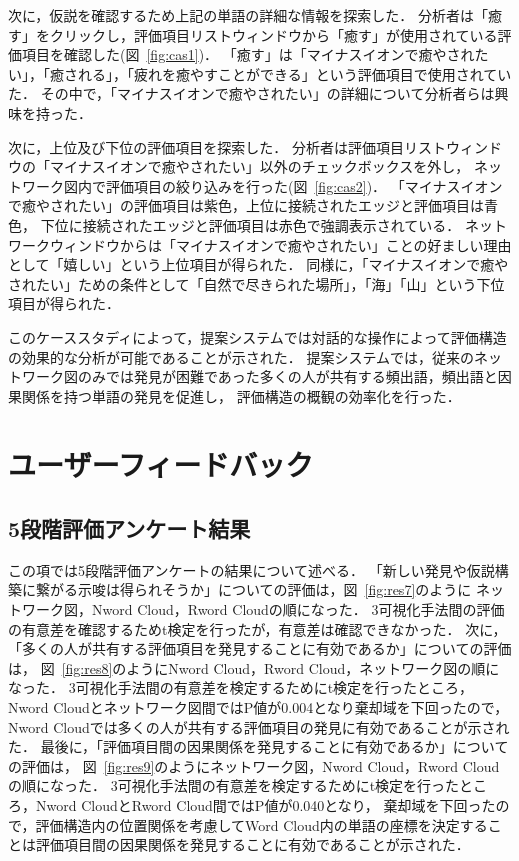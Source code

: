 \documentclass[syuuron]{kuee}
\begin{document}
	次に，仮説を確認するため上記の単語の詳細な情報を探索した．
	分析者は「癒す」をクリックし，評価項目リストウィンドウから「癒す」が使用されている評価項目を確認した(図~\ref{fig:cas1})．
	「癒す」は「マイナスイオンで癒やされたい」，「癒される」，「疲れを癒やすことができる」という評価項目で使用されていた．
	その中で，「マイナスイオンで癒やされたい」の詳細について分析者らは興味を持った．
	
	次に，上位及び下位の評価項目を探索した．
	分析者は評価項目リストウィンドウの「マイナスイオンで癒やされたい」以外のチェックボックスを外し，
	ネットワーク図内で評価項目の絞り込みを行った(図~\ref{fig:cas2})．
	「マイナスイオンで癒やされたい」の評価項目は紫色，上位に接続されたエッジと評価項目は青色，
	下位に接続されたエッジと評価項目は赤色で強調表示されている．
	ネットワークウィンドウからは「マイナスイオンで癒やされたい」ことの好ましい理由として「嬉しい」という上位項目が得られた．
	同様に，「マイナスイオンで癒やされたい」ための条件として「自然で尽きられた場所」，「海」「山」という下位項目が得られた．
	
	このケーススタディによって，提案システムでは対話的な操作によって評価構造の効果的な分析が可能であることが示された．
	提案システムでは，従来のネットワーク図のみでは発見が困難であった多くの人が共有する頻出語，頻出語と因果関係を持つ単語の発見を促進し，
	評価構造の概観の効率化を行った．
	
	\section{ユーザーフィードバック}
		\subsection{5段階評価アンケート結果}
		この項では5段階評価アンケートの結果について述べる．
		「新しい発見や仮説構築に繋がる示唆は得られそうか」についての評価は，図~\ref{fig:res7}のように
		ネットワーク図，Nword Cloud，Rword Cloudの順になった．
		3可視化手法間の評価の有意差を確認するためt検定を行ったが，有意差は確認できなかった．
		次に，「多くの人が共有する評価項目を発見することに有効であるか」についての評価は，
		図~\ref{fig:res8}のようにNword Cloud，Rword Cloud，ネットワーク図の順になった．
		3可視化手法間の有意差を検定するためにt検定を行ったところ，Nword Cloudとネットワーク図間ではP値が0.004となり棄却域を下回ったので，
		Nword Cloudでは多くの人が共有する評価項目の発見に有効であることが示された．
		最後に，「評価項目間の因果関係を発見することに有効であるか」についての評価は，
		図~\ref{fig:res9}のようにネットワーク図，Nword Cloud，Rword Cloudの順になった．
		3可視化手法間の有意差を検定するためにt検定を行ったところ，Nword CloudとRword Cloud間ではP値が0.040となり，
		棄却域を下回ったので，評価構造内の位置関係を考慮してWord Cloud内の単語の座標を決定することは評価項目間の因果関係を発見することに有効であることが示された．
	
\end{document}
